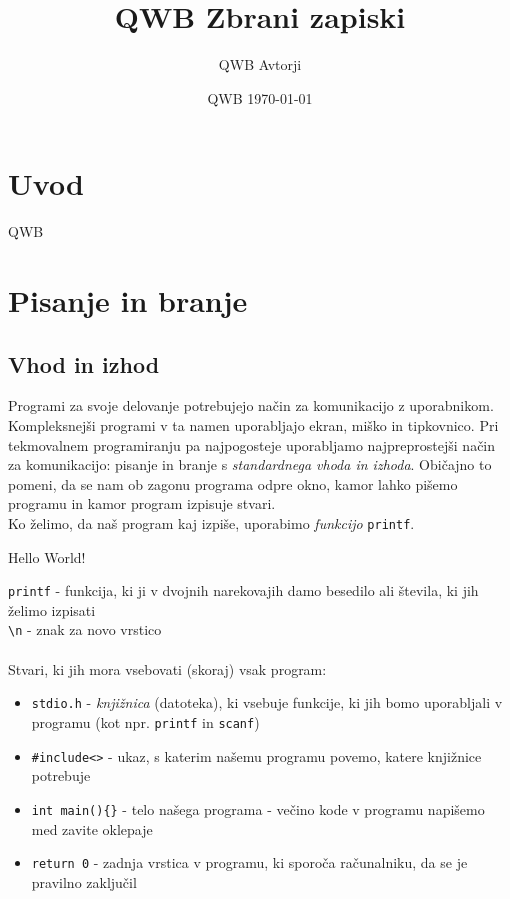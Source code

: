 \documentclass{book}
\title{QWB Zbrani zapiski}
\date{QWB \today}
\author{QWB Avtorji}
\begin{document}
\maketitle

\tableofcontents
\pagebreak

\chapter{Uvod}

QWB

\chapter{Pisanje in branje}

\section{Vhod in izhod}
Programi za svoje delovanje potrebujejo način za komunikacijo z
uporabnikom. Kompleksnejši programi v ta namen uporabljajo ekran, miško
in tipkovnico. Pri tekmovalnem programiranju pa najpogosteje uporabljamo najpreprostejši način za komunikacijo: pisanje in branje s \emph{standardnega vhoda in izhoda}. Običajno to pomeni, da se nam ob zagonu programa odpre okno, kamor lahko pišemo programu in kamor program izpisuje stvari.\\
Ko želimo, da naš program kaj izpiše, uporabimo \emph{funkcijo} \verb+printf+.
\begin{examples}


\begin{inout}
\tcblower
Hello World!
\end{inout}

\end{examples}

\verb+printf+ - funkcija, ki ji v dvojnih narekovajih damo besedilo ali števila, ki jih želimo izpisati\\
\verb+\n+ - znak za novo vrstico
\\\\
Stvari, ki jih mora vsebovati (skoraj) vsak program:
\begin{itemize}
	\item \verb+stdio.h+ - \emph{knjižnica} (datoteka), ki vsebuje funkcije, ki jih bomo uporabljali v programu (kot npr. \verb+printf+ in \verb+scanf+)
	\item \verb+#include<>+ - ukaz, s katerim našemu programu povemo, katere knjižnice potrebuje
	\item \verb+int main(){}+ - telo našega programa - večino kode v programu napišemo med zavite oklepaje
	\item \verb+return 0+ - zadnja vrstica v programu, ki sporoča računalniku, da se je pravilno zaključil
\end{itemize}
\end{document}
